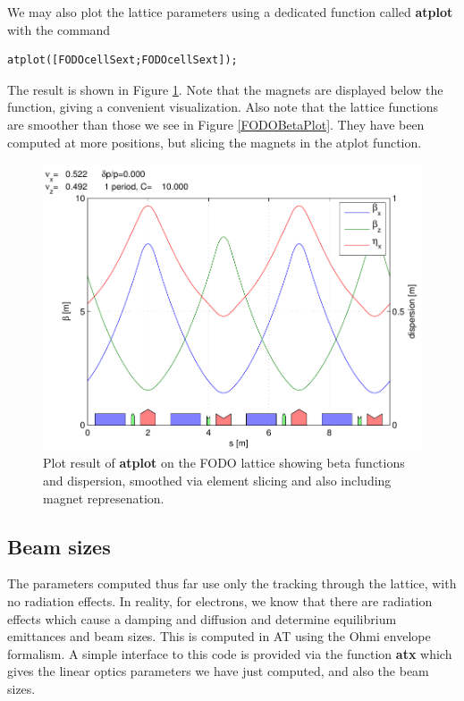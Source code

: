 \documentclass[acus]{article}
\newcommand{\mfun}[1]{{\bf{#1}}}
\begin{document}
We may also plot the lattice parameters using a dedicated function called \mfun{atplot}
with the command
\begin{verbatim}
atplot([FODOcellSext;FODOcellSext]);
\end{verbatim}
The result is shown in Figure \ref{FODOATPlot}. Note that the magnets are displayed below
the function, giving a convenient visualization.  Also note that the lattice functions are smoother
than those we see in Figure \ref{FODOBetaPlot}.
They have been computed at more positions, but slicing the magnets in the atplot function.

\begin{figure}[htb]
\centering
\includegraphics[scale=0.5]{FODOATPlot.pdf}
\caption{Plot result of \mfun{atplot} on the FODO lattice showing beta functions and dispersion,
smoothed via element slicing and also including magnet represenation.}
\label{FODOATPlot}
\end{figure}

\subsection{Beam sizes}
The parameters computed thus far use only the tracking through the lattice, with no radiation
effects.  In reality, for electrons, we know that there are radiation effects which cause
a damping and diffusion and determine equilibrium emittances and beam sizes.
This is computed in AT using the Ohmi envelope formalism.  A simple interface to this code
is provided via the function \mfun{atx} which gives the linear optics parameters we have
just computed, and also the beam sizes.
\end{document}
